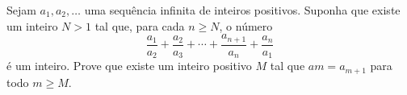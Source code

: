Sejam $a_1, a_2, \dots$ uma sequência infinita de inteiros positivos. Suponha que existe um
inteiro $N > 1$ tal que, para cada $n \ge N$, o número
$$\frac{a_1}{a_2} + \frac{a_2}{a_3} + \cdots + \frac{a_{n+1}}{a_n} + \frac{a_n}{a_1}$$
é um inteiro. Prove que existe um inteiro positivo $M$ tal que $am = a_{m+1}$ para todo $m \ge M$.